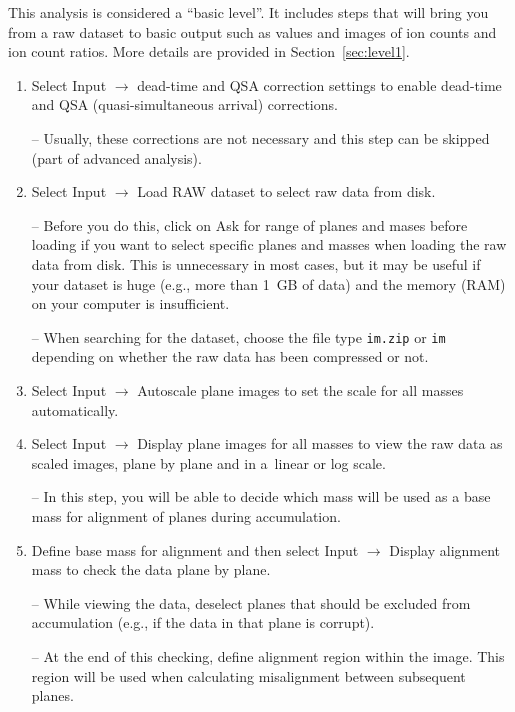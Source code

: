 \documentclass[a4paper, 11pt]{article}
\newcommand{\ttt}[1]{\texttt{#1}}
\newcommand{\lans}[1]{{\color{magenta}#1}}
\newcommand{\lanscb}[1]{{\color{darkgreen}#1}}
\newcommand{\lanstf}[1]{{\color{cyan}#1}}
\newcommand\ra{\rightarrow}
\newcommand\addon[1]{-- {\small #1}}
\begin{document}
This analysis is considered a ``basic level''. It includes steps that will bring you from a raw dataset to basic output such as values and images of ion counts and ion count ratios. More details are provided in Section~\ref{sec:level1}.

\begin{enumerate}

\item Select \lans{Input} $\ra$ \lans{dead-time and QSA correction settings} to enable dead-time and QSA (quasi-simultaneous arrival) corrections.

\addon{Usually, these corrections are not necessary and this step can be skipped (part of advanced analysis).}

\item Select \lans{Input} $\ra$ \lans{Load RAW dataset} to select raw data from disk. 

\addon{Before you do this, click on \lans{Ask for range of planes and mases before loading} if you want to select specific planes and masses when loading the raw data from disk. This is unnecessary in most cases, but it may be useful if your dataset is huge (e.g., more than 1~GB of data) and the memory (RAM) on your computer is insufficient.}

\addon{When searching for the dataset, choose the file type \ttt{im.zip} or \ttt{im} depending on whether the raw data has been compressed or not.}

\item Select \lans{Input} $\ra$ \lans{Autoscale plane images} to set the scale for all masses automatically. 

\item Select \lans{Input} $\ra$ \lans{Display plane images for all masses} to view the raw data as scaled images, plane by plane and in a~linear or log scale. 

\addon{In this step, you will be able to decide which mass will be used as a \lanstf{base mass for alignment} of planes during accumulation.}

\item Define \lanstf{base mass for alignment} and then select \lans{Input} $\ra$ \lans{Display alignment mass} to check the data plane by plane. 

\addon{While viewing the data, \lanscb{deselect planes} that should be excluded from accumulation (e.g., if the data in that plane is corrupt).}

\addon{At the end of this checking, \lans{define alignment region} within the image. This region will be used when calculating misalignment between subsequent planes. }


\end{enumerate}
\end{document}
